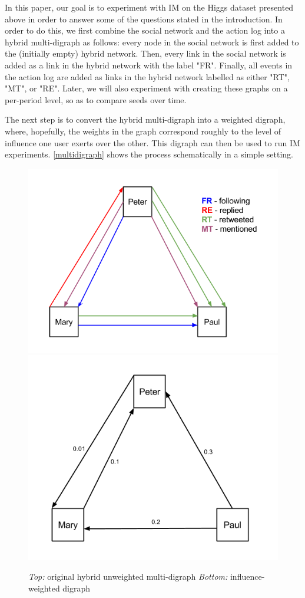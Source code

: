 \documentclass[sigconf]{acmart}
\begin{document}
In this paper, our goal is to experiment with IM on the Higgs dataset presented above in order to answer some of the questions stated in the introduction. In order to do this, we first combine the social network and the action log into a hybrid multi-digraph as follows: every node in the social network is first added to the (initially empty) hybrid network. Then, every link in the social network is added as a link in the hybrid network with the label "FR". Finally, all events in the action log are added as links in the hybrid network labelled as either "RT", "MT", or "RE". Later, we will also experiment with creating these graphs on a per-period level, so as to compare seeds over time.

The next step is to convert the hybrid multi-digraph into a weighted digraph, where, hopefully, the weights in the graph correspond roughly to the level of influence one user exerts over the other. This digraph can then be used to run IM experiments. \autoref{multidigraph} shows the process schematically in a simple setting. 

\begin{figure}[htbp]
\begin{center}
\includegraphics[width=.9\linewidth]{Figures/MultiDiGraph.png}
\includegraphics[width=.9\linewidth]{Figures/MultiDiGraphII.png}
\caption{\emph{Top:} original hybrid unweighted multi-digraph
\emph{Bottom: } influence-weighted digraph}
\label{multidigraph}
\end{center}
\end{figure}
\end{document}

